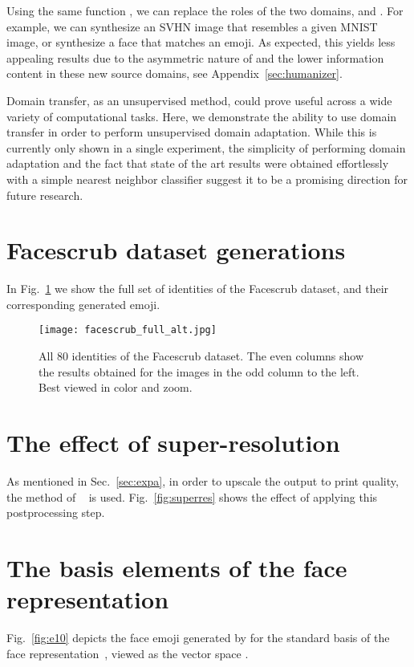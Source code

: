 \documentclass{article} \usepackage{iclr2017_conference,times}
\begin{document}
Using the same function , we can replace the roles of the two domains,  and . For example, we can synthesize an SVHN image that resembles a given MNIST image, or synthesize a face that matches an emoji. As expected, this yields less appealing results due to the asymmetric nature of  and the lower information content in these new source domains, see Appendix~\ref{sec:humanizer}.

Domain transfer, as an unsupervised method, could prove useful across a wide variety of computational tasks. Here, we demonstrate the ability to use domain transfer in order to perform unsupervised domain adaptation. While this is currently only shown in a single experiment, the simplicity of performing domain adaptation and the fact that state of the art results were obtained effortlessly with a simple nearest neighbor classifier suggest it to be a promising direction for future research.




\FloatBarrier

\newpage
\appendix

\section{Facescrub dataset generations}
\label{sec:facescrub}
In Fig.~\ref{fig:allfacescrub} we show the full set of identities of the Facescrub dataset, and their corresponding generated emoji.

\begin{figure}[H]
\centering
\texttt{[image: facescrub\_full\_alt.jpg]}
\caption{\label{fig:allfacescrub}All 80 identities of the Facescrub dataset. The even columns show the results obtained for the images in the odd column to the left. Best viewed in color and zoom.}
\end{figure}


\newpage
\section{The effect of super-resolution}
\label{sec:superres}
As mentioned in Sec.~\ref{sec:expa}, in order to upscale the  output to print quality, the method of ~\cite{superres} is used. Fig.~\ref{fig:superres} shows the effect of applying this postprocessing step.
\section{The basis elements of the face representation}
\label{sec:e10}
Fig.~\ref{fig:e10} depicts the face emoji generated by  for the standard basis of the face representation~\citep{deepface}, viewed as the vector space . 
\end{document}
